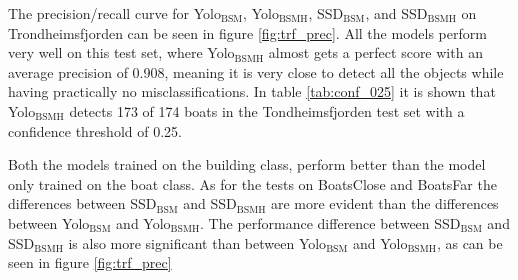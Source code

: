 The precision/recall curve for Yolo$_{\text{BSM}}$, Yolo$_{\text{BSMH}}$, SSD$_{\text{BSM}}$, and SSD$_{\text{BSMH}}$ on Trondheimsfjorden can be seen in figure \ref{fig:trf_prec}. All the models perform very well on this test set, where Yolo$_{\text{BSMH}}$ almost gets a perfect score with an average precision of 0.908, meaning it is very close to detect all the objects while having practically no misclassifications. In table \ref{tab:conf_025} it is shown that Yolo$_{\text{BSMH}}$ detects 173 of 174 boats in the Tondheimsfjorden test set with a confidence threshold of 0.25. 

\vspace{3mm}

\noindent
Both the models trained on the building class, perform better than the model only trained on the boat class. As for the tests on BoatsClose and BoatsFar the differences between SSD$_{\text{BSM}}$ and SSD$_{\text{BSMH}}$ are more evident than the differences between Yolo$_{\text{BSM}}$ and Yolo$_{\text{BSMH}}$. The performance difference between SSD$_{\text{BSM}}$ and SSD$_{\text{BSMH}}$ is also more significant than between Yolo$_{\text{BSM}}$ and Yolo$_{\text{BSMH}}$, as can be seen in figure \ref{fig:trf_prec}


